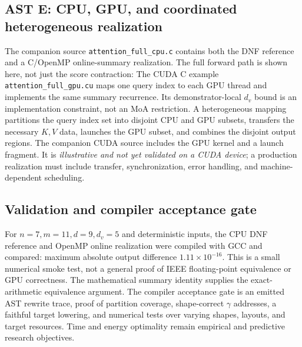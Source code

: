 \documentclass[11pt]{article}
\begin{document}
\subsection{AST E: CPU, GPU, and coordinated heterogeneous realization}
The companion source \texttt{attention\_full\_cpu.c} contains both the DNF reference and a C/OpenMP online-summary realization. The full forward path is shown here, not just the score contraction:
\noindent{}
The CUDA C example \texttt{attention\_full\_gpu.cu} maps one query index to each GPU thread and implements the same summary recurrence. Its demonstrator-local $d_v$ bound is an implementation constraint, not an MoA restriction. A heterogeneous mapping partitions the query index set into disjoint CPU and GPU subsets, transfers the necessary $K,V$ data, launches the GPU subset, and combines the disjoint output regions. The companion CUDA source includes the GPU kernel and a launch fragment. It is \emph{illustrative and not yet validated on a CUDA device}; a production realization must include transfer, synchronization, error handling, and machine-dependent scheduling.

\subsection{Validation and compiler acceptance gate}
For $n=7,m=11,d=9,d_v=5$ and deterministic inputs, the CPU DNF reference and OpenMP online realization were compiled with GCC and compared: maximum absolute output difference $1.11\times10^{-16}$. This is a small numerical smoke test, not a general proof of IEEE floating-point equivalence or GPU correctness. The mathematical summary identity supplies the exact-arithmetic equivalence argument. The compiler acceptance gate is an emitted AST rewrite trace, proof of partition coverage, shape-correct $\gamma$ addresses, a faithful target lowering, and numerical tests over varying shapes, layouts, and target resources. Time and energy optimality remain empirical and predictive research objectives.
\end{document}
